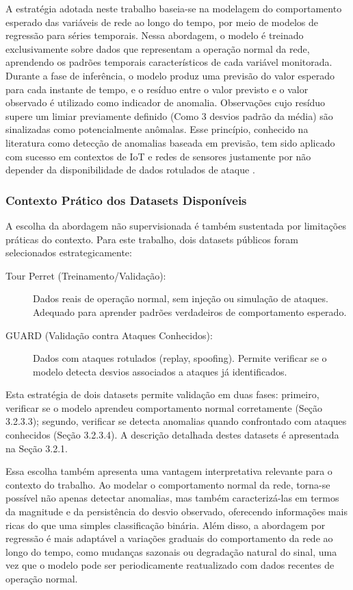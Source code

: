 A estratégia adotada neste trabalho baseia-se na modelagem do comportamento 
esperado das variáveis de rede ao longo do tempo, por meio de modelos de 
regressão para séries temporais. Nessa abordagem, o modelo é treinado 
exclusivamente sobre dados que representam a operação normal da rede, 
aprendendo os padrões temporais característicos de cada variável monitorada. Durante a fase de inferência, o modelo produz uma previsão do valor esperado 
para cada instante de tempo, e o resíduo entre o valor previsto e o valor 
observado é utilizado como indicador de anomalia. Observações cujo resíduo 
supere um limiar previamente definido (Como 3 desvios padrão da média) são sinalizadas como potencialmente 
anômalas. Esse princípio, conhecido na literatura como detecção de anomalias 
baseada em previsão, tem sido aplicado com sucesso em contextos de IoT e 
redes de sensores justamente por não depender da disponibilidade de dados 
rotulados de ataque \cite{chalapathy2019}.

\subsubsection{Contexto Prático dos Datasets Disponíveis}

A escolha da abordagem não supervisionada é também sustentada por 
limitações práticas do contexto. Para este trabalho, dois datasets 
públicos foram selecionados estrategicamente:

\begin{description}
    \item[Tour Perret (Treinamento/Validação):] Dados reais de operação 
    normal, sem injeção ou simulação de ataques. Adequado para aprender 
    padrões verdadeiros de comportamento esperado.
    
    \item[GUARD (Validação contra Ataques Conhecidos):] Dados com ataques 
    rotulados (replay, spoofing). Permite verificar se o modelo detecta 
    desvios associados a ataques já identificados.
\end{description}

Esta estratégia de dois datasets permite validação em duas fases: 
primeiro, verificar se o modelo aprendeu comportamento normal 
corretamente (Seção 3.2.3.3); segundo, verificar se detecta anomalias 
quando confrontado com ataques conhecidos (Seção 3.2.3.4). A descrição 
detalhada destes datasets é apresentada na Seção 3.2.1.

Essa escolha também apresenta uma vantagem interpretativa relevante para o 
contexto do trabalho. Ao modelar o comportamento normal da rede, torna-se 
possível não apenas detectar anomalias, mas também caracterizá-las em termos 
da magnitude e da persistência do desvio observado, oferecendo informações 
mais ricas do que uma simples classificação binária. Além disso, a abordagem 
por regressão é mais adaptável a variações graduais do comportamento da rede 
ao longo do tempo, como mudanças sazonais ou degradação natural do sinal, 
uma vez que o modelo pode ser periodicamente reatualizado com dados recentes 
de operação normal.

